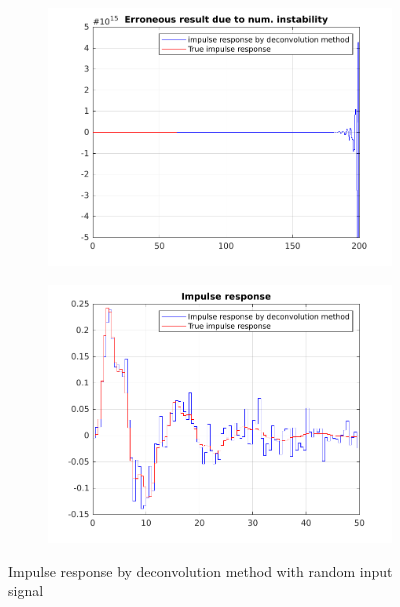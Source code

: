\documentclass{scrartcl}
\begin{document}
\begin{figure}[h]
	\centering
	\begin{subfigure}{.49\textwidth}
		\includegraphics[width=\textwidth]{figures/original_impulse_response.pdf}
		\label{fig:originalimpulse}
	\end{subfigure}
	\begin{subfigure}{.49\textwidth}
		\includegraphics[width=\textwidth]{figures/impulse_response.pdf}
		\label{fig:impulseresponse}
	\end{subfigure}
	\caption{Impulse response by deconvolution method with random input signal}\label{fig:deconvolution}
\end{figure}
\end{document}
